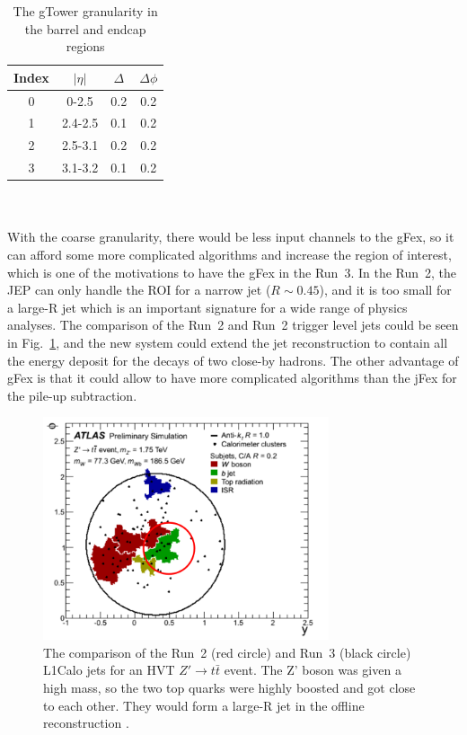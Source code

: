 \begin{table}[h]
	\caption{The gTower granularity in the barrel and endcap regions}
	\renewcommand{\arraystretch}{1.3}
	\centering
	\begin{tabular}{| c | c | c | c | }
		\hline
		\hline
		Index      &    $|\eta|$        &     $\Delta$     & $\Delta\phi$   \\
		\hline
		0          &     0-2.5          & 0.2                          &  0.2                          \\
		\hline
		1          &     2.4-2.5           & 0.1                          &  0.2                         \\
		\hline
		2      &     2.5-3.1       & 0.2                      &  0.2                       \\
		\hline 
		3      &     3.1-3.2       & 0.1                      &  0.2                       \\
		\hline
		\hline
	\end{tabular}
	\label{Tab:granularity_gT}
\end{table}
\noindent
\\
\\With the coarse granularity, there would be less input channels to the gFex, so it can afford some more complicated algorithms and increase the region of interest, which is one of the motivations to have the gFex in the Run~3. In the Run~2, the JEP can only handle the ROI for a narrow jet ($R\sim 0.45$), and it is too small for a large-R jet which is an important signature for a wide range of physics analyses. The comparison of the Run~2 and Run~2 trigger level jets could be seen in Fig.~\ref{Fig:ZPrimett}, and the new system could extend the jet reconstruction to contain all the energy deposit for the decays of two close-by hadrons. The other advantage of gFex is that it could allow to have more complicated algorithms than the jFex for the pile-up subtraction. 
\begin{figure}[!h]                
	\includegraphics[width=0.75\textwidth]{Chapter6/TrigJetRange.png}
	\begin{center}
		\caption{The comparison of the Run~2 (red circle) and Run~3 (black circle) L1Calo jets for an HVT $Z'\to t\bar{t}$ event. The Z' boson was given a high mass, so the two top quarks were highly boosted and got close to each other. They would form a large-R jet in the offline reconstruction \cite{Tang:2289434}.  }
		\label{Fig:ZPrimett}            
	\end{center}
\end{figure}
